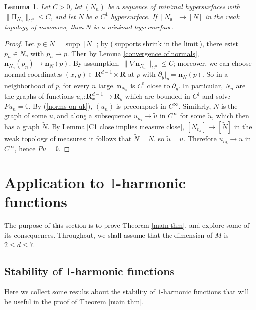 \documentclass[reqno,11pt]{amsart}
\newcommand{\RR}{\mathbf{R}}
\DeclareMathOperator{\supp}{supp}
\newcommand{\Two}{\mathrm{I\!I}}
\newcommand{\normal}{\mathbf n}
\newtheorem{lemma}[theorem]{Lemma}
\theoremstyle{definition}
\numberwithin{equation}{section}
\begin{document}
\begin{lemma}\label{measured convergence is smooth convergence}
Let $C > 0$, let $(N_n)$ be a sequence of minimal hypersurfaces with $\|\Two_{N_n}\|_{C^0} \leq C$, and let $N$ be a $C^1$ hypersurface.
If $[N_n] \to [N]$ in the weak topology of measures, then $N$ is a minimal hypersurface.
\end{lemma}
\begin{proof}
Let $p \in N = \supp [N]$; by (\ref{supports shrink in the limit}), there exist $p_n \in N_n$ with $p_n \to p$.
Then by Lemma \ref{convergence of normals}, $\normal_{N_n}(p_n) \to \normal_N(p)$.
By assumption, $\|\nabla \normal_{N_n}\|_{C^0} \leq C$; moreover, we can choose normal coordinates $(x, y) \in \RR^{d - 1} \times \RR$ at $p$ with $\partial_y|_p = \normal_N(p)$.
So in a neighborhood of $p$, for every $n$ large, $\normal_{N_n}$ is $C^0$ close to $\partial_y$.
In particular, $N_n$ are the graphs of functions $u_n: \RR^{d - 1}_x \to \RR_y$ which are bounded in $C^1$ and solve $Pu_n = 0$.
By (\ref{norms on uk}), $(u_n)$ is precompact in $C^\infty$.
Similarly, $N$ is the graph of some $u$, and along a subsequence $u_{n_k} \to \tilde u$ in $C^\infty$ for some $\tilde u$, which then has a graph $\tilde N$.
By Lemma \ref{C1 close implies measure close}, $[N_{n_k}] \to [\tilde N]$ in the weak topology of measures; it follows that $\tilde N = N$, so $\tilde u = u$.
Therefore $u_{n_k} \to u$ in $C^\infty$, hence $Pu = 0$.
\end{proof}


\section{Application to \texorpdfstring{$1$-harmonic}{one-harmonic} functions}\label{1harmonic sec}
The purpose of this section is to prove Theorem \ref{main thm}, and explore some of its consequences.
Throughout, we shall assume that the dimension of $M$ is $2 \leq d \leq 7$.

\subsection{Stability of \texorpdfstring{$1$-harmonic functions}{one-harmonic functions}}
Here we collect some results about the stability of $1$-harmonic functions that will be useful in the proof of Theorem \ref{main thm}.
\end{document}
